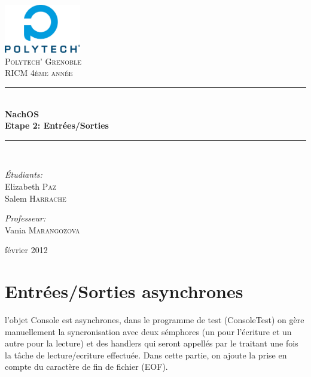 \documentclass[a4paper,10pt]{article}
\newcommand{\HRule}{\rule{\linewidth}{0.5mm}}
\begin{document}
\begin{titlepage}

\begin{center}


\includegraphics[width=0.25\textwidth]{./images/logo}\\[1cm]

\textsc{\LARGE Polytech' Grenoble}\\[1.5cm]

\textsc{\Large RICM 4\`eme ann\'ee}\\[1.2cm]


\HRule \\[0.4cm]
{ \huge \bfseries NachOS\\[0.6cm]
Etape 2: Entrées/Sorties}
\\[0.4cm]

\HRule \\[2cm]

\begin{minipage}{0.4\textwidth}
\begin{flushleft} \large
\emph{\'Etudiants:}\\
Elizabeth \textsc{Paz} \\
Salem \textsc{Harrache}
\end{flushleft}
\end{minipage}
\begin{minipage}{0.4\textwidth}
\begin{flushright} \large
\emph{Professeur:} \\
Vania \textsc{Marangozova}
\end{flushright}
\end{minipage}

\vfill

{\large  février 2012}

\end{center}

\end{titlepage}

\section{Entrées/Sorties asynchrones}

l'objet Console est asynchrones, dans le programme de test (ConsoleTest) on
gère manuellement la syncronisation avec deux sémphores (un pour l'écriture et
un autre pour la lecture) et des handlers qui seront appellés par le traitant
une fois la tâche de lecture/ecriture effectuée. Dans cette partie, on ajoute la
prise en compte du caractère de fin de fichier (EOF).
\end{document}
